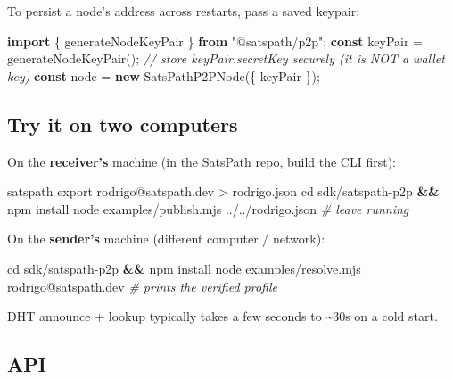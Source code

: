 \documentclass[
]{article}
\newenvironment{Shaded}{}{}
\newcommand{\BuiltInTok}[1]{\textcolor[rgb]{0.00,0.50,0.00}{#1}}
\newcommand{\CommentTok}[1]{\textcolor[rgb]{0.38,0.63,0.69}{\textit{#1}}}
\newcommand{\ExtensionTok}[1]{#1}
\newcommand{\FunctionTok}[1]{\textcolor[rgb]{0.02,0.16,0.49}{#1}}
\newcommand{\ImportTok}[1]{\textcolor[rgb]{0.00,0.50,0.00}{\textbf{#1}}}
\newcommand{\KeywordTok}[1]{\textcolor[rgb]{0.00,0.44,0.13}{\textbf{#1}}}
\newcommand{\NormalTok}[1]{#1}
\newcommand{\OperatorTok}[1]{\textcolor[rgb]{0.40,0.40,0.40}{#1}}
\newcommand{\StringTok}[1]{\textcolor[rgb]{0.25,0.44,0.63}{#1}}
\begin{document}
To persist a node's address across restarts, pass a saved keypair:

\begin{Shaded}
\begin{Highlighting}[]
\ImportTok{import}\NormalTok{ \{ generateNodeKeyPair \} }\ImportTok{from} \StringTok{"@satspath/p2p"}\OperatorTok{;}
\KeywordTok{const}\NormalTok{ keyPair }\OperatorTok{=} \FunctionTok{generateNodeKeyPair}\NormalTok{()}\OperatorTok{;} \CommentTok{// store keyPair.secretKey securely (it is NOT a wallet key)}
\KeywordTok{const}\NormalTok{ node }\OperatorTok{=} \KeywordTok{new} \FunctionTok{SatsPathP2PNode}\NormalTok{(\{ keyPair \})}\OperatorTok{;}
\end{Highlighting}
\end{Shaded}

\hypertarget{try-it-on-two-computers}{%
\subsection{Try it on two computers}\label{try-it-on-two-computers}}

On the \textbf{receiver's} machine (in the SatsPath repo, build the CLI
first):

\begin{Shaded}
\begin{Highlighting}[]
\ExtensionTok{satspath}\NormalTok{ export rodrigo@satspath.dev }\OperatorTok{\textgreater{}}\NormalTok{ rodrigo.json}
\BuiltInTok{cd}\NormalTok{ sdk/satspath{-}p2p }\KeywordTok{\&\&} \ExtensionTok{npm}\NormalTok{ install}
\ExtensionTok{node}\NormalTok{ examples/publish.mjs ../../rodrigo.json     }\CommentTok{\# leave running}
\end{Highlighting}
\end{Shaded}

On the \textbf{sender's} machine (different computer / network):

\begin{Shaded}
\begin{Highlighting}[]
\BuiltInTok{cd}\NormalTok{ sdk/satspath{-}p2p }\KeywordTok{\&\&} \ExtensionTok{npm}\NormalTok{ install}
\ExtensionTok{node}\NormalTok{ examples/resolve.mjs rodrigo@satspath.dev   }\CommentTok{\# prints the verified profile}
\end{Highlighting}
\end{Shaded}

DHT announce + lookup typically takes a few seconds to
\textasciitilde30s on a cold start.

\hypertarget{api}{%
\subsection{API}\label{api}}
\end{document}
